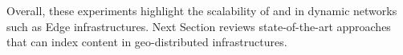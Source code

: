 


\begin{asparadesc}
  \item[Overall,] these experiments highlight the scalability of \NAME
    and \NAMEC in dynamic networks such as Edge infrastructures. Next
    Section reviews state-of-the-art approaches that can index content
    in geo-distributed infrastructures.
\end{asparadesc}



